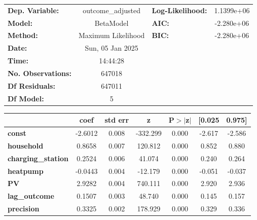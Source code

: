 \begin{center}
\begin{tabular}{lclc}
\toprule
\textbf{Dep. Variable:}    & outcome\_adjusted  & \textbf{  Log-Likelihood:    } & 1.1399e+06  \\
\textbf{Model:}            &     BetaModel      & \textbf{  AIC:               } & -2.280e+06  \\
\textbf{Method:}           & Maximum Likelihood & \textbf{  BIC:               } & -2.280e+06  \\
\textbf{Date:}             &  Sun, 05 Jan 2025  & \textbf{                     } &             \\
\textbf{Time:}             &      14:44:28      & \textbf{                     } &             \\
\textbf{No. Observations:} &       647018       & \textbf{                     } &             \\
\textbf{Df Residuals:}     &       647011       & \textbf{                     } &             \\
\textbf{Df Model:}         &            5       & \textbf{                     } &             \\
\bottomrule
\end{tabular}
\begin{tabular}{lcccccc}
                           & \textbf{coef} & \textbf{std err} & \textbf{z} & \textbf{P$> |$z$|$} & \textbf{[0.025} & \textbf{0.975]}  \\
\midrule
\textbf{const}             &      -2.6012  &        0.008     &  -332.299  &         0.000        &       -2.617    &       -2.586     \\
\textbf{household}         &       0.8658  &        0.007     &   120.812  &         0.000        &        0.852    &        0.880     \\
\textbf{charging\_station} &       0.2524  &        0.006     &    41.074  &         0.000        &        0.240    &        0.264     \\
\textbf{heatpump}          &      -0.0443  &        0.004     &   -12.179  &         0.000        &       -0.051    &       -0.037     \\
\textbf{PV}                &       2.9282  &        0.004     &   740.111  &         0.000        &        2.920    &        2.936     \\
\textbf{lag\_outcome}      &       0.1507  &        0.003     &    48.740  &         0.000        &        0.145    &        0.157     \\
\textbf{precision}         &       0.3325  &        0.002     &   178.929  &         0.000        &        0.329    &        0.336     \\
\bottomrule
\end{tabular}
\end{center}